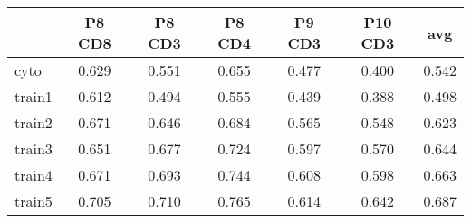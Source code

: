 \begin{tabular}{lcccccc}
   \hline  &P8 CD8& P8 CD3& P8 CD4& P9 CD3& P10 CD3& avg\\ 
\hline
cyto & 0.629 & 0.551 & 0.655 & 0.477 & 0.400 & 0.542 \\ 
  train1 & 0.612 & 0.494 & 0.555 & 0.439 & 0.388 & 0.498 \\ 
  train2 & 0.671 & 0.646 & 0.684 & 0.565 & 0.548 & 0.623 \\ 
  train3 & 0.651 & 0.677 & 0.724 & 0.597 & 0.570 & 0.644 \\ 
  train4 & 0.671 & 0.693 & 0.744 & 0.608 & 0.598 & 0.663 \\ 
  train5 & 0.705 & 0.710 & 0.765 & 0.614 & 0.642 & 0.687 \\ 
   \hline
\end{tabular}
